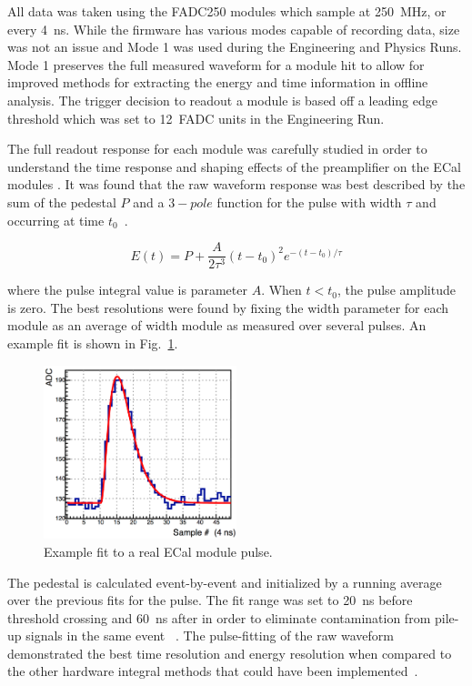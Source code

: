 All data was taken using the FADC250 modules which sample at 250~MHz, or every 4~ns. While the firmware has various modes capable of recording data, size was not an issue and Mode 1 was used during the Engineering and Physics Runs. Mode 1 preserves the full measured waveform for a module hit to allow for improved methods for extracting the energy and time information in offline analysis. The trigger decision to readout a module is based off a leading edge threshold which was set to 12~FADC units in the Engineering Run. 

The full readout response for each module was carefully studied in order to understand the time response and shaping effects of the preamplifier on the ECal modules \cite{charles_2014}. It was found that the raw waveform response was best described by the sum of the pedestal $P$ and a $3-pole$ function for the pulse with width $\tau$ and occurring at time $t_0$~\cite{charles_2014}.

\begin{equation}
	\label{eq:thrpole}
	E(t) = P + \dfrac{A}{2\tau^3}(t-t_0)^2e^{-(t-t_0)/\tau} 
\end{equation}

where the pulse integral value is parameter $A$. When $t<t_0$, the pulse amplitude is zero. The best resolutions were found by fixing the width parameter for each module as an average of width module as measured over several pulses. An example fit is shown in Fig.~\ref{Figure:mode1fit}.

\begin{figure}[htb]
  \centering
      \includegraphics[width=0.5\textwidth]{pics/performance/mode1fit.png}
  \caption[Pulse-fitting to Mode 1 ECal data]{Example fit to a real ECal module pulse.}
  \label{Figure:mode1fit}
\end{figure}

The pedestal is calculated event-by-event and initialized by a running average over the previous fits for the pulse. The fit range was set to 20~ns before threshold crossing and 60~ns after in order to eliminate contamination from pile-up signals in the same event ~\cite{baltzell_ecal_2015}. The pulse-fitting of the raw waveform demonstrated the best time resolution and energy resolution when compared to the other hardware integral methods that could have been implemented~\cite{baltzell_ecal_2015}.
